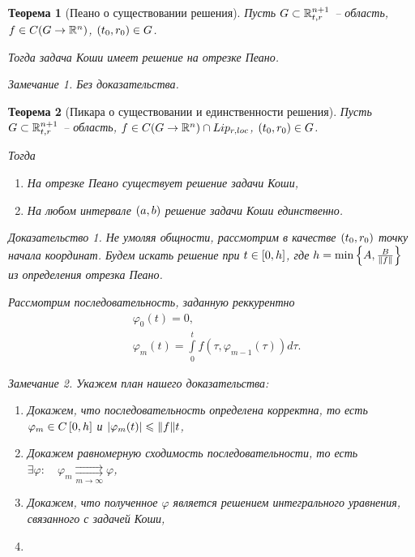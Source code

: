 \documentclass[a5paper, 10pt]{article}
\theoremstyle{definition}
\theoremstyle{plain}
\newtheorem{Th}{Теорема}
\theoremstyle{remark}
\newtheorem*{Note}{Замечание}
\newtheorem*{Proof}{Доказательство}
\begin{document}
	\begin{Th}[Пеано о существовании решения]
		Пусть $G \subset \mathbb{R}^{n+1}_{t,r}$ -- область, $f \in C(G \rightarrow \mathbb{R}^n)$, $\left(t_0, r_0\right) \in G$. 
		
		Тогда задача Коши имеет решение на отрезке Пеано.
		\begin{Note}
			Без доказательства.
		\end{Note}
	\end{Th}
	\begin{Th}[Пикара о существовании и единственности решения]
		Пусть $G \subset \mathbb{R}^{n+1}_{t,r}$ -- область, $f \in C(G \rightarrow \mathbb{R}^n) \cap Lip_{r,loc}$, $\left(t_0, r_0\right) \in G$.
		
		Тогда \begin{enumerate}
			\item На отрезке Пеано существует решение задачи Коши,
			\item На любом интервале $\left(a,b\right)$ решение задачи Коши единственно.
		\end{enumerate}
	\begin{Proof}
		Не умоляя общности, рассмотрим в качестве $\left(t_0,r_0\right)$ точку начала координат. 
		Будем искать решение при $t\in \left[0,h\right]$, где $h=\min \left\{A, \frac{B}{\|f\|}\right\}$ из определения отрезка Пеано.
		
		Рассмотрим последовательность, заданную реккурентно 
		\[
		\begin{split}
			&\varphi_0(t) = 0,\\
			&\varphi_m(t) = \int\limits_0^t f(\tau, \varphi_{m-1}(\tau))d\tau.
		\end{split}
		\]
		
		\begin{Note}
			Укажем план нашего доказательства:
			\begin{enumerate}
				\item Докажем, что последовательность определена корректна, то есть $\varphi_m \in C\left[0,h\right]$ и $\left|\varphi_m(t)\right| \leqslant \|f\| t$,
				\item Докажем равномерную сходимость последовательности, то есть $\exists \varphi: \quad \varphi_m \underset{m\to\infty}{\rightrightarrows} \varphi$,
				\item Докажем, что полученное $\varphi$ является решением интегрального уравнения, связанного с задачей Коши,
				\item 
			\end{enumerate}
		\end{Note}
	\end{Proof}
	\end{Th}
\end{document}

